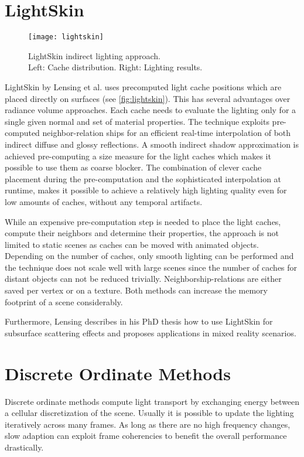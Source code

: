 \documentclass[thesis.tex]{subfiles}
\begin{document}
\section{LightSkin}
\begin{figure}[h]
\centering
\texttt{[image: lightskin]}
\caption{\cite{bib:lightskinthesis} LightSkin indirect lighting approach.\\
Left: Cache distribution. Right: Lighting results. } \label{fig:lightskin}
\end{figure}
LightSkin \cite{bib:LightskinPaper} by Lensing et al. uses precomputed light cache positions which are placed directly on surfaces (see \autoref{fig:lightskin}).
This has several advantages over radiance volume approaches.
Each cache needs to evaluate the lighting only for a single given normal and set of material properties.
The technique exploits pre-computed neighbor-relation ships for an efficient real-time interpolation of both indirect diffuse and glossy reflections.
A smooth indirect shadow approximation is achieved pre-computing a size measure for the light caches which makes it possible to use them as coarse blocker.
The combination of clever cache placement during the pre-computation and the sophisticated interpolation at runtime, makes it possible to achieve a relatively high lighting quality even for low amounts of caches, without any temporal artifacts.

While an expensive pre-computation step is needed to place the light caches, compute their neighbors and determine their properties, the approach is not limited to static scenes as caches can be moved with animated objects.
Depending on the number of caches, only smooth lighting can be performed and the technique does not scale well with large scenes since the number of caches for distant objects can not be reduced trivially.
Neighborship-relations are either saved per vertex or on a texture. 
Both methods can increase the memory footprint of a scene considerably.

Furthermore, Lensing describes in his PhD thesis \cite{bib:lightskinthesis} how to use LightSkin for subsurface scattering effects and proposes applications in mixed reality scenarios.

\section{Discrete Ordinate Methods}
Discrete ordinate methods compute light transport by exchanging energy between a cellular discretization of the scene.
Usually it is possible to update the lighting iteratively across many frames.
As long as there are no high frequency changes, slow adaption can exploit frame coherencies to benefit the overall performance drastically.
\end{document}

